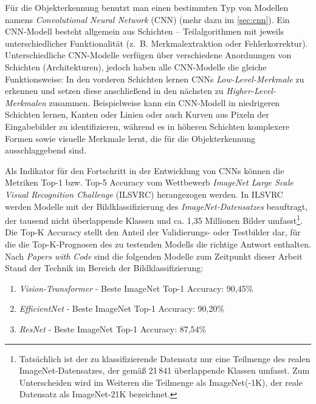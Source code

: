 Für die Objekterkennung benutzt man einen bestimmten Typ von Modellen namens \emph{Convolutional Neural Network} (CNN) (mehr dazu im \autoref{sec:cnn}). Ein CNN-Modell besteht allgemein aus Schichten – Teilalgorithmen mit jeweils unterschiedlicher Funktionalität (z.~B. Merkmalextraktion oder Fehlerkorrektur). Unterschiedliche CNN-Modelle verfügen über verschiedene Anordnungen von Schichten (Architekturen), jedoch haben alle CNN-Modelle die gleiche Funktionsweise: In den vorderen Schichten lernen CNNs \emph{Low-Level-Merkmale} zu erkennen und setzen diese anschließend in den nächsten zu \emph{Higher-Level-Merkmalen} zusammen. Beispielweise kann ein CNN-Modell in niedrigeren Schichten lernen, Kanten oder Linien oder auch Kurven aus Pixeln der Eingabebilder zu identifizieren, während es in höheren Schichten komplexere Formen sowie visuelle Merkmale lernt, die für die Objekterkennung ausschlaggebend sind.

Als Indikator für den Fortschritt in der Entwicklung von CNNs können die Metriken Top-1 bzw. Top-5 Accuracy vom Wettbewerb \emph{ImageNet Large Scale Visual Recognition Challenge} (ILSVRC) \cite{russakovsky2015imagenet} herangezogen werden. In ILSVRC werden Modelle mit der Bildklassifizierung des \emph{ImageNet-Datensatzes} beauftragt, der tausend nicht überlappende Klassen und ca. 1,35 Millionen Bilder umfasst\footnote{Tatsächlich ist der zu klassifizierende Datensatz nur eine Teilmenge des realen ImageNet-Datensatzes, der gemäß \cite{ridnik2021imagenet21k} 21\,841 überlappende Klassen umfasst. Zum Unterscheiden wird im Weiteren die Teilmenge als ImageNet(-1K), der reale Datensatz als ImageNet-21K bezeichnet.}. Die Top-K Accuracy stellt den Anteil der Validierungs- oder Testbilder dar, für die die Top-K-Prognosen des zu testenden Modells die richtige Antwort enthalten. Nach \emph{Papers with Code} \cite{PapersWithCode-ImageNet} sind die folgenden Modelle zum Zeitpunkt dieser Arbeit Stand der Technik im Bereich der Bildklassifizierung:

\begin{enumerate}
	\item \emph{Vision-Transformer} \cite{dosovitskiy2021image} - Beste ImageNet Top-1 Accuracy: 90,45\%  \cite{zhai2021scaling}
	\item \emph{EfficientNet} \cite{tan2020efficientnet} - Beste ImageNet Top-1 Accuracy: 90,20\%  \cite{pham2021meta}
	\item \emph{ResNet} \cite{he2015deep} - Beste ImageNet Top-1 Accuracy: 87,54\% \cite{kolesnikov2020big}
\end{enumerate}

